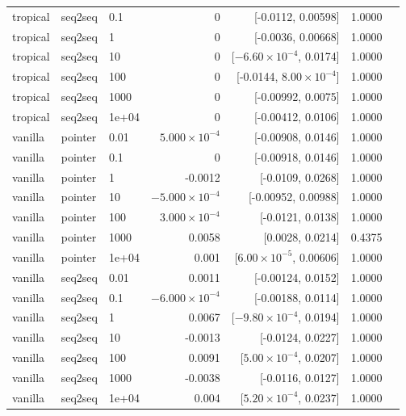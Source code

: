 \documentclass[10pt]{article}
\begin{document}
{\begin{longtable}{lllrrrl}
tropical & seq2seq & 0.1 & 0 & [-0.0112, 0.00598] & 1.0000 & \\
tropical & seq2seq & 1 & 0 & [-0.0036, 0.00668] & 1.0000 & \\
tropical & seq2seq & 10 & 0 & [$-6.60\times10^{-4}$, 0.0174] & 1.0000 & \\
tropical & seq2seq & 100 & 0 & [-0.0144, $8.00\times10^{-4}$] & 1.0000 & \\
tropical & seq2seq & 1000 & 0 & [-0.00992, 0.0075] & 1.0000 & \\
tropical & seq2seq & 1e+04 & 0 & [-0.00412, 0.0106] & 1.0000 & \\
vanilla & pointer & 0.01 & $5.000\times10^{-4}$ & [-0.00908, 0.0146] & 1.0000 & \\
vanilla & pointer & 0.1 & 0 & [-0.00918, 0.0146] & 1.0000 & \\
vanilla & pointer & 1 & -0.0012 & [-0.0109, 0.0268] & 1.0000 & \\
vanilla & pointer & 10 & $-5.000\times10^{-4}$ & [-0.00952, 0.00988] & 1.0000 & \\
vanilla & pointer & 100 & $3.000\times10^{-4}$ & [-0.0121, 0.0138] & 1.0000 & \\
vanilla & pointer & 1000 & 0.0058 & [0.0028, 0.0214] & 0.4375 & \\
vanilla & pointer & 1e+04 & 0.001 & [$6.00\times10^{-5}$, 0.00606] & 1.0000 & \\
vanilla & seq2seq & 0.01 & 0.0011 & [-0.00124, 0.0152] & 1.0000 & \\
vanilla & seq2seq & 0.1 & $-6.000\times10^{-4}$ & [-0.00188, 0.0114] & 1.0000 & \\
vanilla & seq2seq & 1 & 0.0067 & [$-9.80\times10^{-4}$, 0.0194] & 1.0000 & \\
vanilla & seq2seq & 10 & -0.0013 & [-0.0124, 0.0227] & 1.0000 & \\
vanilla & seq2seq & 100 & 0.0091 & [$5.00\times10^{-4}$, 0.0207] & 1.0000 & \\
vanilla & seq2seq & 1000 & -0.0038 & [-0.0116, 0.0127] & 1.0000 & \\
vanilla & seq2seq & 1e+04 & 0.004 & [$5.20\times10^{-4}$, 0.0237] & 1.0000 & \\
\bottomrule
\end{longtable}
}
\end{document}
